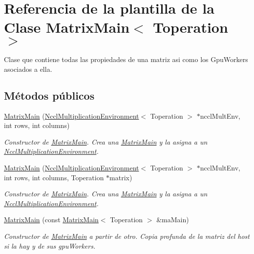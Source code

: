 \hypertarget{classMatrixMain}{}\section{Referencia de la plantilla de la Clase Matrix\+Main$<$ Toperation $>$}
\label{classMatrixMain}


Clase que contiene todas las propiedades de una matriz asi como los Gpu\+Workers asociados a ella.  


\subsection*{Métodos públicos}
\begin{DoxyCompactItemize}
\item 
\hyperlink{classMatrixMain_a0ffc21ba65bbd7b6018e11550b0f27f5}{Matrix\+Main} (\hyperlink{classNcclMultiplicationEnvironment}{Nccl\+Multiplication\+Environment}$<$ Toperation $>$ $\ast$nccl\+Mult\+Env, int rows, int columns)
\begin{DoxyCompactList}\small\item\em Constructor de \hyperlink{classMatrixMain}{Matrix\+Main}. Crea una \hyperlink{classMatrixMain}{Matrix\+Main} y la asigna a un \hyperlink{classNcclMultiplicationEnvironment}{Nccl\+Multiplication\+Environment}. \end{DoxyCompactList}\item 
\hyperlink{classMatrixMain_aa7b43cb57acbd5a1cd971d593a9e7815}{Matrix\+Main} (\hyperlink{classNcclMultiplicationEnvironment}{Nccl\+Multiplication\+Environment}$<$ Toperation $>$ $\ast$nccl\+Mult\+Env, int rows, int columns, Toperation $\ast$matrix)
\begin{DoxyCompactList}\small\item\em Constructor de \hyperlink{classMatrixMain}{Matrix\+Main}. Crea una \hyperlink{classMatrixMain}{Matrix\+Main} y la asigna a un \hyperlink{classNcclMultiplicationEnvironment}{Nccl\+Multiplication\+Environment}. \end{DoxyCompactList}\item 
\hyperlink{classMatrixMain_ab93a59c6dab2de24c2f2a60f1f6f95f2}{Matrix\+Main} (const \hyperlink{classMatrixMain}{Matrix\+Main}$<$ Toperation $>$ \&ma\+Main)
\begin{DoxyCompactList}\small\item\em Constructor de \hyperlink{classMatrixMain}{Matrix\+Main} a partir de otro. Copia profunda de la matriz del host si la hay y de sus gpu\+Workers. \end{DoxyCompactList}\item 

\end{DoxyCompactItemize}

